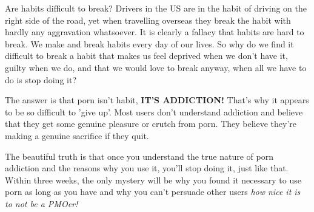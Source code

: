 \documentclass[easypeasy.tex]{subfiles}
\begin{document}
Are habits difficult to break? Drivers in the US are in the habit of driving on the right side of the road, yet when travelling overseas they break the habit with hardly any aggravation whatsoever. It is clearly a fallacy that habits are hard to break. We make and break habits every day of our lives. So why do we find it difficult to break a habit that makes us feel deprived when we don't have it, guilty when we do, and that we would love to break anyway, when all we have to do is stop doing it?

The answer is that porn isn't habit, \textbf{IT'S ADDICTION!} That's why it appears to be so difficult to 'give up'. Most users don't understand addiction and believe that they get some genuine pleasure or crutch from porn. They believe they're making a genuine sacrifice if they quit.

The beautiful truth is that once you understand the true nature of porn addiction and the reasons why you use it, you'll stop doing it, just like that. Within three weeks, the only mystery will be why you found it necessary to use porn as long as you have and why you can't persuade other users \textit{how nice it is to not be a PMOer!}
\end{document}
